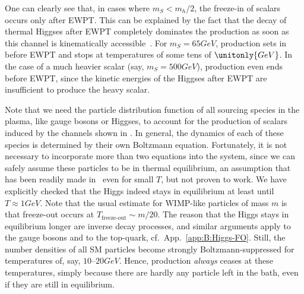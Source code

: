 One can clearly see that, in cases where $m_S<m_h/2$, the freeze-in of scalars occurs only after EWPT. This can be explained by the fact that the decay of thermal Higgses after EWPT completely dominates the production as soon as this channel is kinematically accessible~\cite{Adulpravitchai:2014xna}. For $m_S=\unit{65}{GeV}$, production sets in before EWPT and stops at temperatures of some tens of $\unitonly{GeV}$. In the case of a much heavier scalar (say, $m_S=\unit{500}{GeV}$), production even ends before EWPT, since the kinetic energies of the Higgses after EWPT are insufficient to produce the heavy scalar. 

Note that we need the particle distribution function of all sourcing species in the plasma, like gauge bosons or Higgses, to account for the production of scalars induced by the channels shown in . In general, the dynamics of each of these species is determined by their own Boltzmann equation. Fortunately, it is not necessary to incorporate more than two equations into the system, since we can safely assume these particles to be in thermal equilibrium, an assumption that has been readily made in~\cite{Adulpravitchai:2014xna} even for small $T$, but not proven to work. We have explicitly checked that the Higgs indeed stays in equilibrium at least until $T \approx \unit{1}{GeV}$. Note that the usual estimate for WIMP-like particles of mass $m$ is that freeze-out occurs at $T_\text{freeze-out}\sim m/20$. The reason that the Higgs stays in equilibrium longer are inverse decay processes, and similar arguments apply to the gauge bosons and to the top-quark, cf.\ App.~\ref{app:B:Higgs-FO}. Still, the number densities of all SM particles become strongly Boltzmann-suppressed for temperatures of, say, $10$--$\unit{20}{GeV}$. Hence, production \emph{always} ceases at these temperatures, simply because there are hardly any particle left in the bath, even if they are still in equilibrium.

